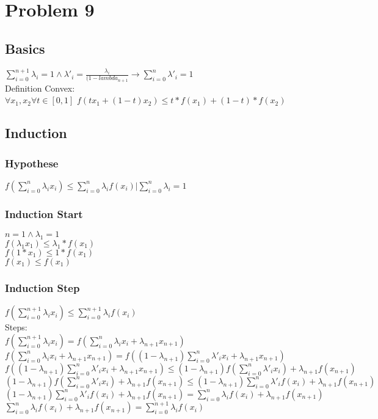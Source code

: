 \section{Problem 9}
\subsection{Basics}
$\sum_{i=0}^{n+1} {\lambda_i} = 1  \wedge \lambda'_i = \frac{\lambda_i}{(1-lambda_{n+1}} \rightarrow \sum_{i=0}^{n} {\lambda'_i} = 1  $ \\ 
Definition Convex: \\ 
$\forall x_1, x_2  \forall t \in [0,1]$ $ f(tx_1 + (1-t) x_2) \leq t*f(x_1) +(1-t)*f(x_2) $
\subsection{Induction}
\subsubsection{Hypothese}
$ f(\sum_{i=0}^{n} {\lambda_i x_i} ) \leq \sum_{i=0}^{n} {\lambda_i f(x_i)} | \sum_{i=0}^{n} {\lambda_i} = 1 $
\subsubsection{Induction Start}
$n = 1 \wedge \lambda_1 = 1 $ \\
$f(\lambda_1x_1) \leq \lambda_1 * f(x_1) $ \\
$f(1*x_1) \leq 1 * f(x_1) $ \\
$f(x_1) \leq f(x_1) $

\subsubsection{Induction Step}

$ f(\sum_{i=0}^{n+1} {\lambda_i x_i} ) \leq \sum_{i=0}^{n+1} {\lambda_i f(x_i)}  $ \\
Steps:\\
$   f(\sum_{i=0}^{n+1} {\lambda_i x_i} )  = f(\sum_{i=0}^{n} {\lambda_i x_i} + \lambda_{n+1}x_{n+1} ) $\\
$f(\sum_{i=0}^{n} {\lambda_i x_i} + \lambda_{n+1}x_{n+1} ) = f((1-\lambda_{n+1}) \sum_{i=0}^{n} {\lambda'_i x_i} + \lambda_{n+1}x_{n+1} )  $\\
$f((1-\lambda_{n+1}) \sum_{i=0}^{n} {\lambda'_i x_i} + \lambda_{n+1}x_{n+1} ) \leq (1-\lambda_{n+1}) f(\sum_{i=0}^{n} {\lambda'_i x_i}) + \lambda_{n+1}f(x_{n+1})$\\ 
$(1-\lambda_{n+1}) f(\sum_{i=0}^{n} {\lambda'_i x_i}) + \lambda_{n+1}f(x_{n+1}) \leq (1-\lambda_{n+1}) \sum_{i=0}^{n} {\lambda'_i f(x_i)} + \lambda_{n+1}f(x_{n+1})$\\
$(1-\lambda_{n+1}) \sum_{i=0}^{n} {\lambda'_i f(x_i)} + \lambda_{n+1}f(x_{n+1}) = \sum_{i=0}^{n} {\lambda_i f(x_i)} + \lambda_{n+1}f(x_{n+1})$\\
 $\sum_{i=0}^{n} {\lambda_i f(x_i)} + \lambda_{n+1}f(x_{n+1})= \sum_{i=0}^{n+1} {\lambda_i f(x_i)}$